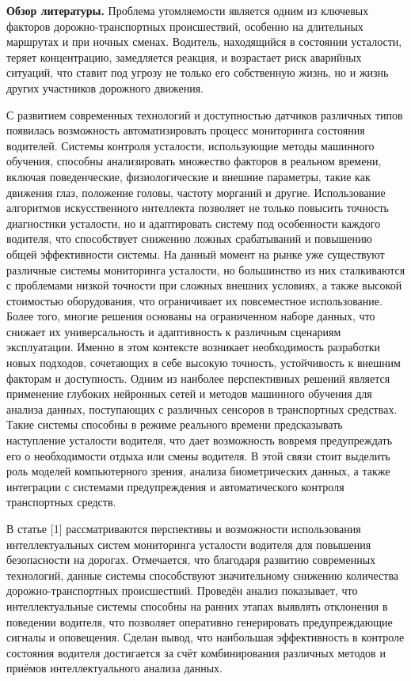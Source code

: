 \begin{multicols}{2}
{\bfseries Обзор литературы.} Проблема утомляемости является одним из
ключевых факторов дорожно-транспортных происшествий, особенно на
длительных маршрутах и при ночных сменах. Водитель, находящийся в
состоянии усталости, теряет концентрацию, замедляется реакция, и
возрастает риск аварийных ситуаций, что ставит под угрозу не только его
собственную жизнь, но и жизнь других участников дорожного движения.

С развитием современных технологий и доступностью датчиков различных
типов появилась возможность автоматизировать процесс мониторинга
состояния водителей. Системы контроля усталости, использующие методы
машинного обучения, способны анализировать множество факторов в реальном
времени, включая поведенческие, физиологические и внешние параметры,
такие как движения глаз, положение головы, частоту морганий и другие.
Использование алгоритмов искусственного интеллекта позволяет не только
повысить точность диагностики усталости, но и адаптировать систему под
особенности каждого водителя, что способствует снижению ложных
срабатываний и повышению общей эффективности системы. На данный момент
на рынке уже существуют различные системы мониторинга усталости, но
большинство из них сталкиваются с проблемами низкой точности при сложных
внешних условиях, а также высокой стоимостью оборудования, что
ограничивает их повсеместное использование. Более того, многие решения
основаны на ограниченном наборе данных, что снижает их универсальность и
адаптивность к различным сценариям эксплуатации. Именно в этом контексте
возникает необходимость разработки новых подходов, сочетающих в себе
высокую точность, устойчивость к внешним факторам и доступность. Одним
из наиболее перспективных решений является применение глубоких нейронных
сетей и методов машинного обучения для анализа данных, поступающих с
различных сенсоров в транспортных средствах. Такие системы способны в
режиме реального времени предсказывать наступление усталости водителя,
что дает возможность вовремя предупреждать его о необходимости отдыха
или смены водителя. В этой связи стоит выделить роль моделей
компьютерного зрения, анализа биометрических данных, а также интеграции
с системами предупреждения и автоматического контроля транспортных
средств.

В статье {[}1{]} рассматриваются перспективы и возможности использования
интеллектуальных систем мониторинга усталости водителя для повышения
безопасности на дорогах. Отмечается, что благодаря развитию современных
технологий, данные системы способствуют значительному снижению
количества дорожно-транспортных происшествий. Проведён анализ
показывает, что интеллектуальные системы способны на ранних этапах
выявлять отклонения в поведении водителя, что позволяет оперативно
генерировать предупреждающие сигналы и оповещения. Сделан вывод, что
наибольшая эффективность в контроле состояния водителя достигается за
счёт комбинирования различных методов и приёмов интеллектуального
анализа данных.


\end{multicols}
